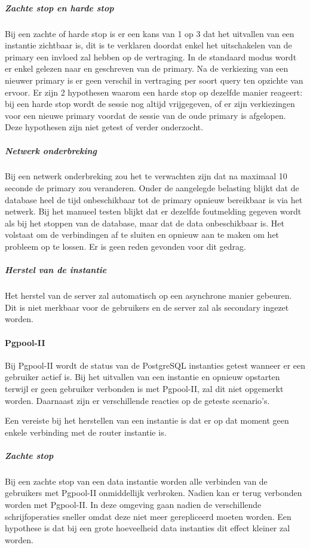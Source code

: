 \subparagraph{Zachte stop en harde stop} Bij een zachte of harde stop is er een kans van 1 op 3 dat het uitvallen van een instantie zichtbaar is, dit is te verklaren doordat enkel het uitschakelen van de primary een invloed zal hebben op de vertraging. In de standaard modus wordt er enkel gelezen naar en geschreven van de primary. Na de verkiezing van een nieuwer primary is er geen verschil in vertraging per soort query ten opzichte van ervoor. Er zijn 2 hypothesen waarom een harde stop op dezelfde manier reageert: bij een harde stop wordt de sessie nog altijd vrijgegeven, of er zijn verkiezingen voor een nieuwe primary voordat de sessie van de oude primary is afgelopen. Deze hypothesen zijn niet getest of verder onderzocht. 

\subparagraph{Netwerk onderbreking} Bij een netwerk onderbreking zou het te verwachten zijn dat na maximaal 10 seconde de primary zou veranderen. Onder de aangelegde belasting blijkt dat de database heel de tijd onbeschikbaar tot de primary opnieuw bereikbaar is via het netwerk. Bij het manueel testen blijkt dat er dezelfde foutmelding gegeven wordt als bij het stoppen van de database, maar dat de data onbeschikbaar is. Het volstaat om de verbindingen af te sluiten en opnieuw aan te maken om het probleem op te lossen. Er is geen reden gevonden voor dit gedrag. 

\subparagraph{Herstel van de instantie} Het herstel van de server zal automatisch op een asynchrone manier gebeuren. Dit is niet merkbaar voor de gebruikers en de server zal als secondary ingezet worden. 

\paragraph{Pgpool-II} Bij Pgpool-II wordt de status van de PostgreSQL instanties getest wanneer er een gebruiker actief is.  Bij het uitvallen van een instantie en opnieuw opstarten terwijl er geen gebruiker verbonden is met Pgpool-II, zal dit niet opgemerkt worden. Daarnaast zijn er verschillende reacties op de geteste scenario's. 

Een vereiste bij het herstellen van een instantie is dat er op dat moment geen enkele verbinding met de router instantie is. 

\subparagraph{Zachte stop} Bij een zachte stop van een data instantie worden alle verbinden van de gebruikers met Pgpool-II onmiddellijk verbroken. Nadien kan er terug verbonden worden met Pgpool-II. In deze omgeving gaan nadien de verschillende schrijfoperaties sneller omdat deze niet meer gerepliceerd moeten worden. Een hypothese is dat bij een grote hoeveelheid data instanties dit effect kleiner zal worden.  

